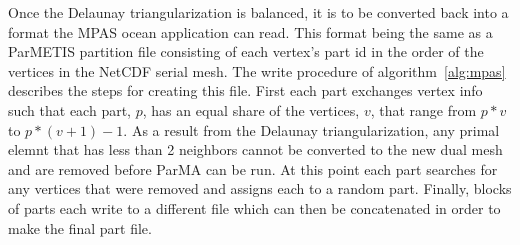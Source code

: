 \documentclass[a4paper]{article}
\begin{document}
Once the Delaunay triangularization is balanced, it is to be converted back into a format the MPAS ocean application can read. This format being the same as a ParMETIS partition file consisting of each vertex's part id in the order of the vertices in the NetCDF serial mesh. The write procedure of algorithm~\ref{alg:mpas} describes the steps for creating this file. First each part exchanges vertex info such that each part, $p$, has an equal share of the vertices, $v$, that range from $p*v$ to $p*(v+1)-1$. As a result from the Delaunay triangularization, any primal elemnt that has less than 2 neighbors cannot be converted to the new dual mesh and are removed before ParMA can be run. At this point each part searches for any vertices that were removed and assigns each to a random part. Finally, blocks of parts each write to a different file which can then be concatenated in order to make the final part file.
\end{document}

